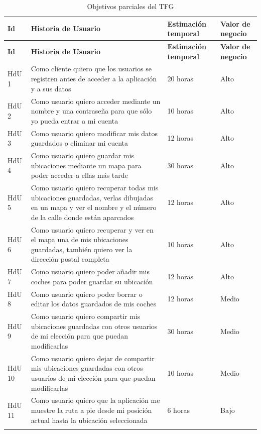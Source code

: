 	\begin{longtable}{p{2cm} p{6cm} p{4cm} p{3cm}}
	  	\hline
  	    \multicolumn{1}{p{2cm}}{\cellcolor{black!30}\textbf{Id}} &
	    \multicolumn{1}{p{6cm}}{\cellcolor{black!30}\textbf{Historia de Usuario}} & 
	 	\multicolumn{1}{p{4cm}}{\cellcolor{black!30}\textbf{Estimación temporal}} &
 	 	\multicolumn{1}{p{3cm}}{\cellcolor{black!30}\textbf{Valor de negocio}}
	 	\\
	 	\toprule 
	   	\endfirsthead
	     
	    \hline
  	    \multicolumn{1}{p{2cm}}{\cellcolor{black!30}\textbf{Id}} &
	    \multicolumn{1}{p{6cm}}{\cellcolor{black!30}\textbf{Historia de Usuario}} & 
	 	\multicolumn{1}{p{4cm}}{\cellcolor{black!30}\textbf{Estimación temporal}} &
 	 	\multicolumn{1}{p{3cm}}{\cellcolor{black!30}\textbf{Valor de negocio}}
	 	\\	 
	 	\toprule
	 	\endhead	

		\rowcolor{gray!25}
		HdU 1	&	Como cliente quiero que los usuarios se registren antes de acceder a la aplicación y a sus datos	
				&	20 horas		&	Alto	\\
		HdU 2	&	Como usuario quiero acceder mediante un nombre y una contraseña para que sólo yo pueda entrar a mi cuenta							&	10 horas	&	Alto	\\
		\rowcolor{gray!25}
		HdU 3	&	Como usuario quiero modificar mis datos guardados	o eliminar mi cuenta												
				&	12 horas	&	Alto	\\ 
		HdU 4	& 	Como usuario quiero guardar mis ubicaciones mediante un mapa para poder acceder a ellas más tarde	
				&	30 horas	&	Alto	\\
		\rowcolor{gray!25}
		HdU 5	&	Como usuario quiero recuperar todas mis ubicaciones guardadas, verlas dibujadas en un mapa y ver el nombre y el número de la calle donde están aparcados
				&	12 horas	&	Alto	\\
		HdU 6	&	Como usuario quiero recuperar y ver en el mapa una de mis ubicaciones guardadas, también quiero ver la dirección postal completa
				&	10 horas	&	Alto	\\
		\rowcolor{gray!25}
		HdU 7	&	Como usuario quiero poder añadir mis coches para poder guardar su ubicación															&	12 horas	&	Alto	\\
		HdU 8	&	Como usuario quiero poder borrar o editar los datos guardados de mis coches
				&	12 horas	&	Medio	\\	
		\rowcolor{gray!25}
		HdU 9	&	Como usuario quiero compartir mis ubicaciones guardadas con otros usuarios de mi elección para que puedan modificarlas			
				&	30 horas&	Medio	\\
		HdU 10	&	Como usuario quiero dejar de compartir mis ubicaciones guardadas con otros usuarios de mi elección para que puedan modificarlas			
				&	10 horas&	Medio	\\
		\rowcolor{gray!25}
		HdU 11	&	Como usuario quiero que la aplicación me muestre la ruta a pie desde mi posición actual hasta la ubicación seleccionada
				&	6 horas	&	Bajo	\\
	    \hline
	  \caption{Objetivos parciales del \ac{TFG}}
	  \label{tab:historia_usuario}
	\end{longtable}

